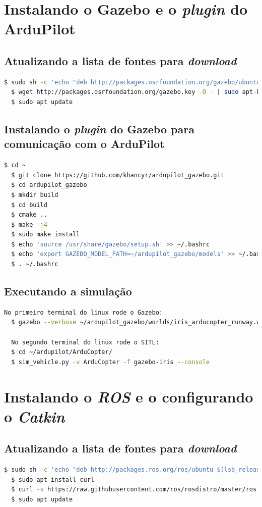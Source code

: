 \documentclass[12pt,a4paper,oneside]{book}
\begin{document}
\section{Instalando o Gazebo e o \textit{plugin} do ArduPilot}

\subsection{Atualizando a lista de fontes para \textit{download}}
\begin{lstlisting}[language=bash]
  $ sudo sh -c 'echo "deb http://packages.osrfoundation.org/gazebo/ubuntu-stable `lsb_release -cs` main" > /etc/apt/sources.list.d/gazebo-stable.list'
  $ wget http://packages.osrfoundation.org/gazebo.key -O - | sudo apt-key add -
  $ sudo apt update
\end{lstlisting}

\subsection{Instalando o \textit{plugin} do Gazebo para comunicação com o ArduPilot}
\begin{lstlisting}[language=bash]
  $ cd ~
  $ git clone https://github.com/khancyr/ardupilot_gazebo.git
  $ cd ardupilot_gazebo
  $ mkdir build
  $ cd build
  $ cmake ..
  $ make -j4
  $ sudo make install
  $ echo 'source /usr/share/gazebo/setup.sh' >> ~/.bashrc
  $ echo 'export GAZEBO_MODEL_PATH=~/ardupilot_gazebo/models' >> ~/.bashrc
  $ . ~/.bashrc
\end{lstlisting}

\subsection{Executando a simulação}
\begin{lstlisting}[language=bash]
  No primeiro terminal do linux rode o Gazebo: 
  $ gazebo --verbose ~/ardupilot_gazebo/worlds/iris_arducopter_runway.world
  
  No segundo terminal do linux rode o SITL:
  $ cd ~/ardupilot/ArduCopter/
  $ sim_vehicle.py -v ArduCopter -f gazebo-iris --console
\end{lstlisting}

\section{Instalando o \textit{ROS} e o configurando o \textit{Catkin}}

\subsection{Atualizando a lista de fontes para \textit{download}}
\begin{lstlisting}[language=bash] 
  $ sudo sh -c 'echo "deb http://packages.ros.org/ros/ubuntu $(lsb_release -sc) main" > /etc/apt/sources.list.d/ros-latest.list'
  $ sudo apt install curl
  $ curl -s https://raw.githubusercontent.com/ros/rosdistro/master/ros.asc | sudo apt-key add -
  $ sudo apt update
\end{lstlisting}
\end{document}
